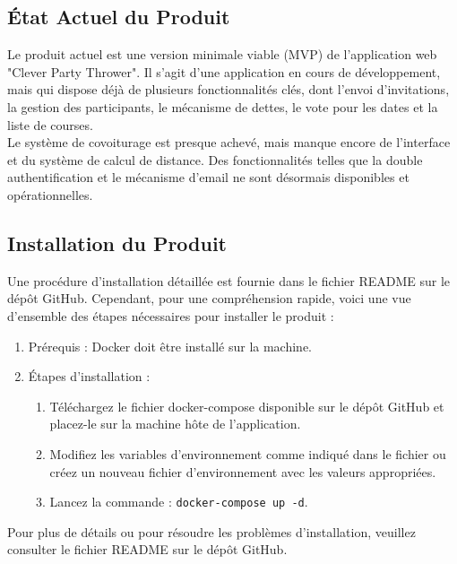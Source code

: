 \subsection{État Actuel du Produit}\label{subsec:etat-actuel-du-produit}

Le produit actuel est une version minimale viable (MVP) de l'application web "Clever Party Thrower".
Il s'agit d'une application en cours de développement, mais qui dispose déjà de plusieurs fonctionnalités clés, dont l'envoi d'invitations,
la gestion des participants, le mécanisme de dettes, le vote pour les dates et la liste de courses.\\

Le système de covoiturage est presque achevé, mais manque encore de l'interface et du système de calcul de distance.
Des fonctionnalités telles que la double authentification et le mécanisme d'email ne sont désormais disponibles et opérationnelles.

\subsection{Installation du Produit}\label{subsec:installation-du-produit}

Une procédure d'installation détaillée est fournie dans le fichier README sur le dépôt GitHub.
Cependant, pour une compréhension rapide,
voici une vue d'ensemble des étapes nécessaires pour installer le produit :

\begin{enumerate}
    \item Prérequis : Docker doit être installé sur la machine.
    \item Étapes d'installation :
    \begin{enumerate}
        \item Téléchargez le fichier docker-compose disponible sur le dépôt GitHub et placez-le sur la machine hôte de l'application.
        \item Modifiez les variables d'environnement comme indiqué dans le fichier ou créez un nouveau fichier d'environnement avec les valeurs appropriées.
        \item Lancez la commande : \texttt{docker-compose up -d}.
    \end{enumerate}
\end{enumerate}

Pour plus de détails ou pour résoudre les problèmes d'installation, veuillez consulter le fichier README sur le dépôt GitHub.

